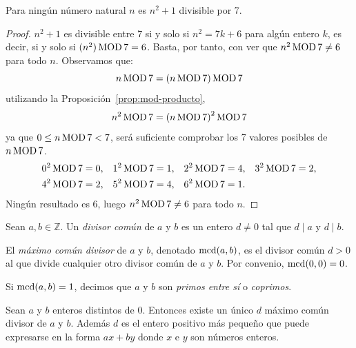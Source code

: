 \begin{exercise}
    Para ningún número natural $n$ es $n^2 + 1$ divisible por 7.
\end{exercise}

\begin{proof}
    $n^2 + 1$ es divisible entre 7 si y solo si $n^2 = 7k + 6$ para algún entero $k$, es decir,
    si y solo si $(n^2) \operatorname{MOD} 7 = 6$.
    Basta, por tanto, con ver que $n^2 \operatorname{MOD} 7 \neq 6$ para todo $n$.
    Observamos que:
    \[ n \operatorname{MOD} 7 = (n \operatorname{MOD} 7) \operatorname{MOD} 7 \]
    utilizando la Proposición~\ref{prop:mod-producto},
    \[ n^2 \operatorname{MOD} 7 = {(n \operatorname{MOD} 7)}^2 \operatorname{MOD} 7 \]
    ya que $0 \le n \operatorname{MOD} 7 < 7$, será suficiente comprobar los 7 valores posibles de $n \operatorname{MOD} 7$.
    \begin{align*}
        0^2 \operatorname{MOD} 7 &= 0, & 1^2 \operatorname{MOD} 7 &= 1, & 2^2 \operatorname{MOD} 7 &= 4, & 3^2 \operatorname{MOD} 7 &= 2, \\
        4^2 \operatorname{MOD} 7 &= 2, & 5^2 \operatorname{MOD} 7 &= 4, & 6^2 \operatorname{MOD} 7 &= 1.
    \end{align*}
    Ningún resultado es 6, luego $n^2 \operatorname{MOD} 7 \neq 6$ para todo $n$.
\end{proof}

\begin{definition}\label{def:mcd}
    Sean $a, b \in \mathbb{Z}$. Un \emph{divisor común} de $a$ y $b$ es un entero
    $d \neq 0$ tal que $d \mid a$ y $d \mid b$.

    El \emph{máximo común divisor} de $a$ y $b$, denotado $\operatorname{mcd}(a,b)$, es el divisor
    común $d > 0$ al que divide cualquier otro divisor común de $a$ y $b$.
    Por convenio, $\operatorname{mcd}(0,0) = 0$.

    Si $\operatorname{mcd}(a,b) = 1$, decimos que $a$ y $b$ son \emph{primos entre sí} o \emph{coprimos}.
\end{definition}

\begin{theorem}\label{teo:bezout}
    Sean $a$ y $b$ enteros distintos de $0$. Entonces existe un único $d$ máximo
    común divisor de $a$ y $b$. Además $d$ es el entero positivo más pequeño que
    puede expresarse en la forma $ax + by$ donde $x$ e $y$ son números enteros.
\end{theorem}

